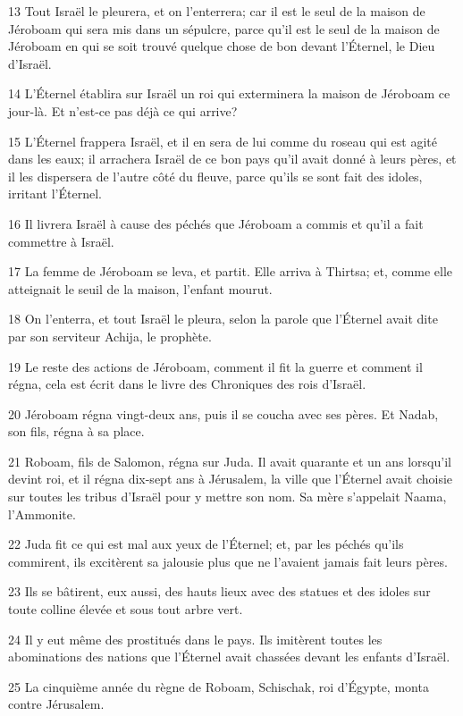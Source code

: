 \par 13 Tout Israël le pleurera, et on l'enterrera; car il est le seul de la maison de Jéroboam qui sera mis dans un sépulcre, parce qu'il est le seul de la maison de Jéroboam en qui se soit trouvé quelque chose de bon devant l'Éternel, le Dieu d'Israël.
\par 14 L'Éternel établira sur Israël un roi qui exterminera la maison de Jéroboam ce jour-là. Et n'est-ce pas déjà ce qui arrive?
\par 15 L'Éternel frappera Israël, et il en sera de lui comme du roseau qui est agité dans les eaux; il arrachera Israël de ce bon pays qu'il avait donné à leurs pères, et il les dispersera de l'autre côté du fleuve, parce qu'ils se sont fait des idoles, irritant l'Éternel.
\par 16 Il livrera Israël à cause des péchés que Jéroboam a commis et qu'il a fait commettre à Israël.
\par 17 La femme de Jéroboam se leva, et partit. Elle arriva à Thirtsa; et, comme elle atteignait le seuil de la maison, l'enfant mourut.
\par 18 On l'enterra, et tout Israël le pleura, selon la parole que l'Éternel avait dite par son serviteur Achija, le prophète.
\par 19 Le reste des actions de Jéroboam, comment il fit la guerre et comment il régna, cela est écrit dans le livre des Chroniques des rois d'Israël.
\par 20 Jéroboam régna vingt-deux ans, puis il se coucha avec ses pères. Et Nadab, son fils, régna à sa place.
\par 21 Roboam, fils de Salomon, régna sur Juda. Il avait quarante et un ans lorsqu'il devint roi, et il régna dix-sept ans à Jérusalem, la ville que l'Éternel avait choisie sur toutes les tribus d'Israël pour y mettre son nom. Sa mère s'appelait Naama, l'Ammonite.
\par 22 Juda fit ce qui est mal aux yeux de l'Éternel; et, par les péchés qu'ils commirent, ils excitèrent sa jalousie plus que ne l'avaient jamais fait leurs pères.
\par 23 Ils se bâtirent, eux aussi, des hauts lieux avec des statues et des idoles sur toute colline élevée et sous tout arbre vert.
\par 24 Il y eut même des prostitués dans le pays. Ils imitèrent toutes les abominations des nations que l'Éternel avait chassées devant les enfants d'Israël.
\par 25 La cinquième année du règne de Roboam, Schischak, roi d'Égypte, monta contre Jérusalem.
